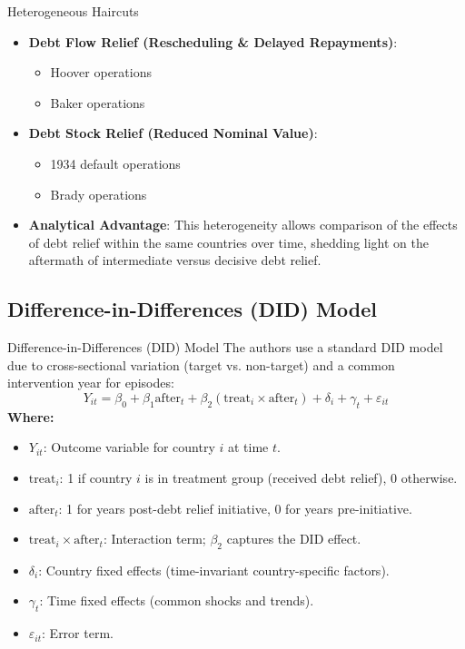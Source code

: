 \documentclass{beamer}
\begin{document}
\begin{frame}{Heterogeneous Haircuts}
  \begin{itemize}
    \item \textbf{Debt Flow Relief (Rescheduling \& Delayed Repayments)}:
    \begin{itemize}
        \item Hoover operations
        \item Baker operations
    \end{itemize}
    \item \textbf{Debt Stock Relief (Reduced Nominal Value)}:
    \begin{itemize}
        \item 1934 default operations
        \item Brady operations
    \end{itemize}
    \item \textbf{Analytical Advantage}: This heterogeneity allows comparison of the effects of debt relief within the same countries over time, shedding light on the aftermath of intermediate versus decisive debt relief.
  \end{itemize}
\end{frame}

\subsection{Difference-in-Differences (DID) Model}
\begin{frame}{Difference-in-Differences (DID) Model}
  The authors use a standard DID model due to cross-sectional variation (target vs. non-target) and a common intervention year for episodes:
  \begin{equation*}
    Y_{it} = \beta_0 + \beta_1 \text{after}_t + \beta_2 (\text{treat}_i \times \text{after}_t) + \delta_i + \gamma_t + \varepsilon_{it}
  \end{equation*}
  \textbf{Where:}
  \begin{itemize}
    \item $Y_{it}$: Outcome variable for country $i$ at time $t$.
    \item $\text{treat}_i$: 1 if country $i$ is in treatment group (received debt relief), 0 otherwise.
    \item $\text{after}_t$: 1 for years post-debt relief initiative, 0 for years pre-initiative.
    \item $\text{treat}_i \times \text{after}_t$: Interaction term; $\beta_2$ captures the DID effect.
    \item $\delta_i$: Country fixed effects (time-invariant country-specific factors).
    \item $\gamma_t$: Time fixed effects (common shocks and trends).
    \item $\varepsilon_{it}$: Error term.
  \end{itemize}
\end{frame}
\end{document}
